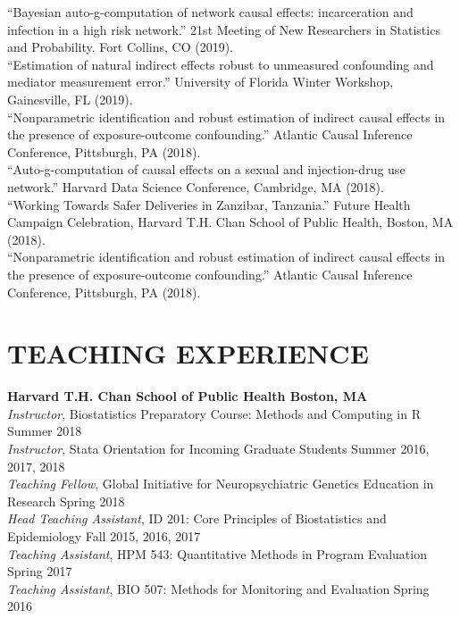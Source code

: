 \documentclass[12pt]{article}
\begin{document}
``Bayesian auto-g-computation of network causal effects: incarceration and infection in a high risk network.'' 21st Meeting of New Researchers in 
Statistics and Probability. Fort Collins, CO (2019). \\

``Estimation of natural indirect effects robust to unmeasured confounding and mediator measurement error.'' University of Florida Winter Workshop, Gainesville, FL (2019). \\

``Nonparametric identification and robust estimation of indirect causal effects in the presence of exposure-outcome confounding.'' Atlantic Causal Inference Conference, Pittsburgh, PA (2018). \\

``Auto-g-computation of causal effects on a sexual and injection-drug use network.'' Harvard Data Science Conference, Cambridge, MA (2018). \\

``Working Towards Safer Deliveries in Zanzibar, Tanzania.'' Future Health Campaign Celebration, Harvard T.H. Chan School of Public Health, Boston, MA (2018). \\

``Nonparametric identification and robust estimation of indirect causal effects in the presence of exposure-outcome confounding.'' Atlantic Causal Inference Conference, Pittsburgh, PA (2018). 



\section*{\textbf{{\large T}{EACHING} {\large E}{XPERIENCE}}}
\textbf{Harvard T.H. Chan School of Public Health \hfill \hfill Boston, MA} \\
\textit{Instructor}, Biostatistics Preparatory Course: Methods and Computing in R \hfill \hfill Summer 2018 \\
\textit{Instructor}, Stata Orientation for Incoming Graduate Students \hfill \hfill	Summer 2016, 2017, 2018\\
\textit{Teaching Fellow}, Global Initiative for Neuropsychiatric Genetics Education in Research \hfill \hfill Spring 2018 \\
\textit{Head Teaching Assistant}, ID 201: Core Principles of Biostatistics and Epidemiology \hfill \hfill Fall 2015, 2016, 2017 \\
\textit{Teaching Assistant}, HPM 543: Quantitative Methods in Program Evaluation \hfill \hfill Spring 2017 \\
\textit{Teaching Assistant}, BIO 507: Methods for Monitoring and Evaluation \hfill \hfill Spring 2016 \\
\end{document}
